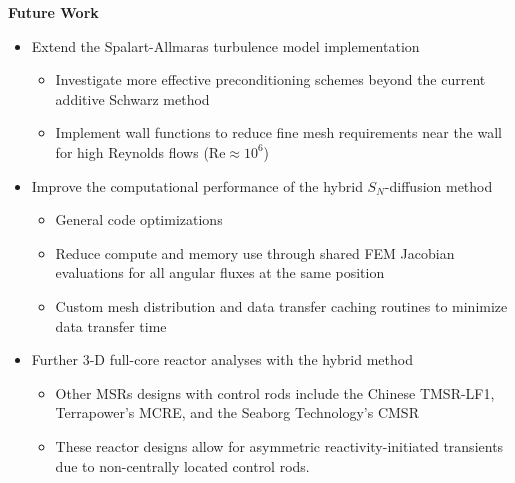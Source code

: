 \begin{frame}
  \begin{block}{\textbf{Future Work}}
    \begin{itemize}
      \item Extend the Spalart-Allmaras turbulence model implementation
      \begin{itemize}
        \item Investigate more effective preconditioning schemes beyond the
          current additive Schwarz method
        \item Implement wall functions to reduce fine mesh requirements near the wall for high
          Reynolds flows (Re$\approx 10^6$)
      \end{itemize}
      \item Improve the computational performance of the hybrid $S_N$-diffusion method
      \begin{itemize}
        \item General code optimizations
        \item Reduce compute and memory use through shared FEM Jacobian evaluations for all angular
          fluxes at the same position
        \item Custom mesh distribution and data transfer caching routines to minimize data transfer time
      \end{itemize}
      \item Further 3-D full-core reactor analyses with the hybrid method
      \begin{itemize}
        \item Other MSRs designs with control rods include the Chinese TMSR-LF1,
          Terrapower's MCRE, and the Seaborg Technology's CMSR
        \item These reactor designs allow for asymmetric reactivity-initiated transients due to
          non-centrally located control rods.
      \end{itemize}
    \end{itemize}
  \end{block}
\end{frame}
